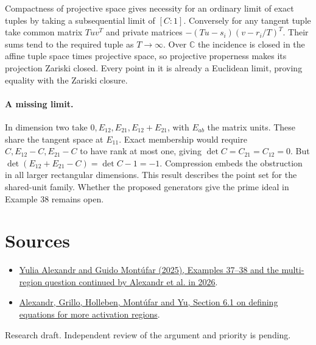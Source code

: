 \documentclass[10pt]{article}
\begin{document}
Compactness of projective space gives necessity for an ordinary limit of exact tuples by taking a subsequential limit of $[C:1]$. Conversely for any tangent tuple take common matrix $Tuv^T$ and private matrices $-(Tu-s_i)(v-r_i/T)^T$. Their sums tend to the required tuple as $T\to\infty$. Over $\mathbb C$ the incidence is closed in the affine tuple space times projective space, so projective properness makes its projection Zariski closed. Every point in it is already a Euclidean limit, proving equality with the Zariski closure.

\paragraph{A missing limit.} In dimension two take $0,E_{12},E_{21},E_{12}+E_{21}$, with $E_{ab}$ the matrix units. These share the tangent space at $E_{11}$. Exact membership would require $C,E_{12}-C,E_{21}-C$ to have rank at most one, giving $\det C=C_{21}=C_{12}=0$. But $\det(E_{12}+E_{21}-C)=\det C-1=-1$. Compression embeds the obstruction in all larger rectangular dimensions. This result describes the point set for the shared-unit family. Whether the proposed generators give the prime ideal in Example 38 remains open.

\section*{Sources}
\begin{itemize}
\item \href{https://arxiv.org/abs/2508.03867}{Yulia Alexandr and Guido Montúfar (2025), Examples 37--38 and the multi-region question continued by Alexandr et al. in 2026}.
\item \href{https://arxiv.org/abs/2611.23846}{Alexandr, Grillo, Holleben, Montúfar and Yu, Section 6.1 on defining equations for more activation regions}.
\end{itemize}
{\small Research draft. Independent review of the argument and priority is pending.}
\end{document}
